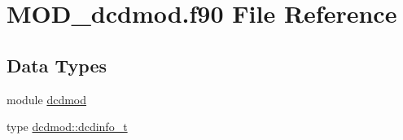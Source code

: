 \hypertarget{MOD__dcdmod_8f90}{\section{M\-O\-D\-\_\-dcdmod.\-f90 File Reference}
\label{MOD__dcdmod_8f90}
}
\subsection*{Data Types}
\begin{DoxyCompactItemize}
\item 
module \hyperlink{classdcdmod}{dcdmod}
\item 
type \hyperlink{structdcdmod_1_1dcdinfo__t}{dcdmod\-::dcdinfo\-\_\-t}
\end{DoxyCompactItemize}
